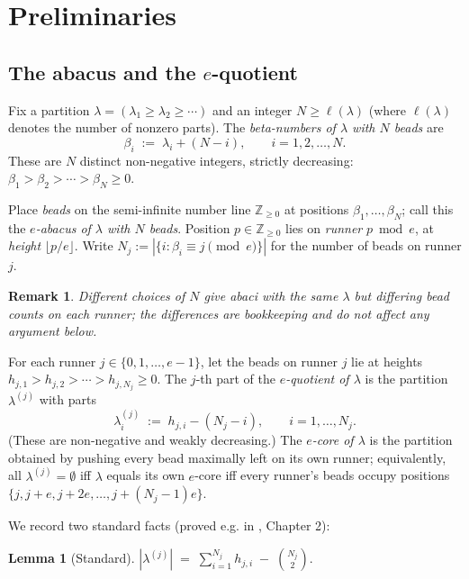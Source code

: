 \documentclass[11pt]{article}
\newtheorem{lemma}[theorem]{Lemma}
\newtheorem{remark}[theorem]{Remark}
\theoremstyle{definition}
\begin{document}
\section{Preliminaries}

\subsection{The abacus and the $e$-quotient}
\label{sec:abacus}

Fix a partition $\lambda = (\lambda_1 \ge \lambda_2 \ge \cdots)$ and an integer
$N \ge \ell(\lambda)$ (where $\ell(\lambda)$ denotes the number of nonzero
parts). The \emph{beta-numbers of $\lambda$ with $N$ beads} are
\[
    \beta_i \;:=\; \lambda_i + (N - i), \qquad i = 1, 2, \ldots, N.
\]
These are $N$ distinct non-negative integers, strictly decreasing:
$\beta_1 > \beta_2 > \cdots > \beta_N \ge 0$.

Place \emph{beads} on the semi-infinite number line $\mathbb{Z}_{\ge 0}$ at
positions $\beta_1, \ldots, \beta_N$; call this the \emph{$e$-abacus of
$\lambda$ with $N$ beads}. Position $p \in \mathbb{Z}_{\ge 0}$ lies on
\emph{runner} $p \bmod e$, at \emph{height} $\lfloor p / e \rfloor$. Write
$N_j := |\{i : \beta_i \equiv j \pmod e\}|$ for the number of beads on runner
$j$.

\begin{remark}
Different choices of $N$ give abaci with the same $\lambda$ but differing bead
counts on each runner; the differences are bookkeeping and do not affect any
argument below.
\end{remark}

For each runner $j \in \{0, 1, \ldots, e-1\}$, let the beads on runner $j$
lie at heights $h_{j,1} > h_{j,2} > \cdots > h_{j, N_j} \ge 0$. The $j$-th
part of the \emph{$e$-quotient of $\lambda$} is the partition
$\lambda^{(j)}$ with parts
\[
    \lambda^{(j)}_i \;:=\; h_{j, i} - (N_j - i), \qquad i = 1, \ldots, N_j.
\]
(These are non-negative and weakly decreasing.) The \emph{$e$-core of
$\lambda$} is the partition obtained by pushing every bead maximally left on
its own runner; equivalently, all $\lambda^{(j)} = \emptyset$ iff $\lambda$
equals its own $e$-core iff every runner's beads occupy positions
$\{j, j+e, j+2e, \ldots, j + (N_j-1)e\}$.

We record two standard facts (proved e.g. in \cite{JamesKerber}, Chapter 2):
\begin{lemma}[Standard]
\label{lem:size-abacus}
$\displaystyle |\lambda^{(j)}| \;=\; \sum_{i=1}^{N_j} h_{j,i} \;-\; \binom{N_j}{2}.$
\end{lemma}
\end{document}
